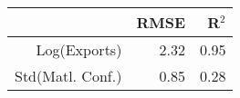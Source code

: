 \begin{table}[ht]
\centering
\begin{tabular}{rrr}
  \hline
 & RMSE & R$^{2}$ \\ 
  \hline
Log(Exports) & 2.32 & 0.95 \\ 
  Std(Matl. Conf.) & 0.85 & 0.28 \\ 
   \hline
\end{tabular}
\end{table}
